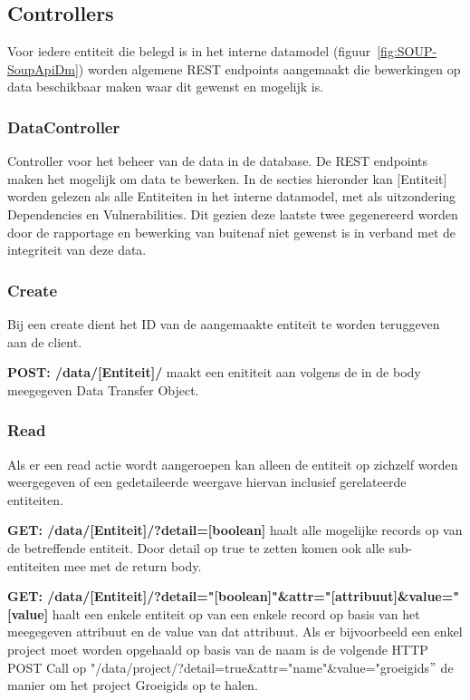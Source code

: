 \subsection{Controllers}\label{subsec:controllers}
Voor iedere entiteit die belegd is in het interne datamodel (figuur~\ref{fig:SOUP-SoupApiDm}) worden algemene REST endpoints aangemaakt die bewerkingen op data beschikbaar maken waar dit gewenst en mogelijk is.
\subsubsection{DataController}
Controller voor het beheer van de data in de database. De REST endpoints maken het mogelijk om data te bewerken. In de secties hieronder kan [Entiteit] worden gelezen als alle Entiteiten in het interne datamodel, met als uitzondering Dependencies en Vulnerabilities. Dit gezien deze laatste twee gegenereerd worden door de rapportage en bewerking van buitenaf niet gewenst is in verband met de integriteit van deze data.
\subsubsection*{Create}
Bij een create dient het ID van de aangemaakte entiteit te worden teruggeven aan de client.

\textbf{POST: /data/[Entiteit]/} maakt een enititeit aan volgens de in de body meegegeven Data Transfer Object.

\subsubsection*{Read}
Als er een read actie wordt aangeroepen kan alleen de entiteit op zichzelf worden weergegeven of een gedetaileerde weergave hiervan inclusief gerelateerde entiteiten.

\textbf{GET: /data/[Entiteit]/?detail=[boolean]} haalt alle mogelijke records op van de betreffende entiteit. Door detail op true te zetten komen ook alle sub-entiteiten mee met de return body.

\textbf{GET: /data/[Entiteit]/?detail="[boolean]"\&attr="[attribuut]\&value="[value]} haalt een enkele entiteit op van een enkele record op basis van het meegegeven attribuut en de value van dat attribuut. Als er bijvoorbeeld een enkel project moet worden opgehaald op basis van de naam is de volgende HTTP POST Call op "/data/project/?detail=true\&attr="name"\&value="groeigids$"$ de manier om het project Groeigids op te halen.

